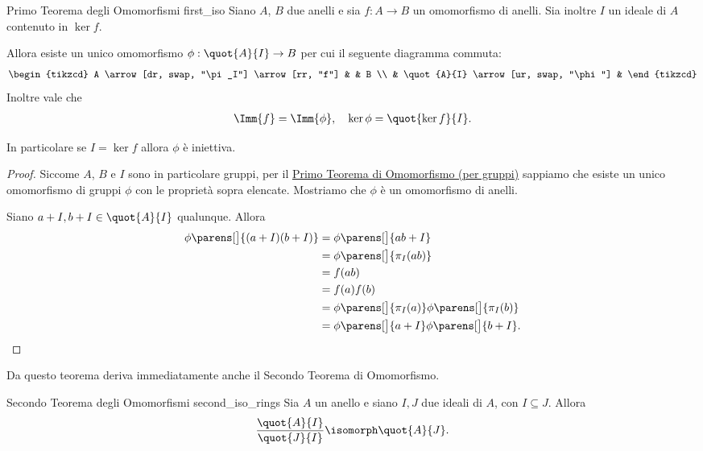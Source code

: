 \begin{theorem}
    {Primo Teorema degli Omomorfismi} {first_iso}
    Siano $A$, $B$ due anelli e sia $f : A \to B$ un omomorfismo di anelli. Sia inoltre $I$ un ideale di $A$ contenuto in $\ker f$.

    Allora esiste un unico omomorfismo $\phi : \quot{A}{I} \to B$ per cui il seguente diagramma commuta:
    \begin{equation}
        \begin{tikzcd}
            A \arrow[dr, swap, "\pi_I"] \arrow[rr, "f"] & & B \\
            & \quot{A}{I} \arrow[ur, swap, "\phi"] &
        \end{tikzcd}
    \end{equation}
    Inoltre vale che \begin{align*}
        \Imm{f} = \Imm{\phi}, \quad \ker \phi = \quot{\ker f}{I}.
    \end{align*}

    In particolare se $I = \ker f$ allora $\phi$ è iniettiva.
\end{theorem}
\begin{proof}
    Siccome $A$, $B$ e $I$ sono in particolare gruppi, per il \hyperref[th:first_iso]{Primo Teorema di Omomorfismo (per gruppi)} sappiamo che esiste un unico omomorfismo di gruppi $\phi$ con le proprietà sopra elencate. Mostriamo che $\phi$ è un omomorfismo di anelli.

    Siano $a + I, b + I \in \quot{A}{I}$ qualunque. Allora \begin{align*}
        \phi\parens[\big]{(a+I)(b +I)} &= \phi\parens[\big]{ab + I}\\
        &= \phi\parens[\big]{\pi_I(ab)}\\
        &= f(ab)\\
        &= f(a)f(b)\\
        &= \phi\parens[\big]{\pi_I(a)}\phi\parens[\big]{\pi_I(b)}\\
        &= \phi\parens[\big]{a+I}\phi\parens[\big]{b+I}. \qedhere
    \end{align*}
\end{proof}

Da questo teorema deriva immediatamente anche il Secondo Teorema di Omomorfismo.
\begin{theorem}
    {Secondo Teorema degli Omomorfismi} {second_iso_rings}
    Sia $A$ un anello e siano $I, J$ due ideali di $A$, con $I \subseteq J$. Allora \begin{equation}
        \frac{\quot{A}{I}}{\quot{J}{I}} \isomorph \quot{A}{J}.
    \end{equation}
\end{theorem}

